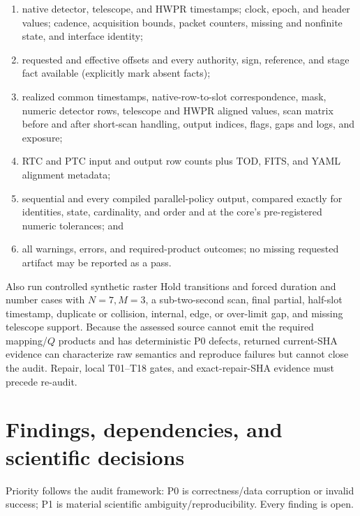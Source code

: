 \documentclass[11pt]{article}
\begin{document}
\begin{enumerate}[leftmargin=2.2em,nosep]
\item native detector, telescope, and HWPR timestamps; clock, epoch, and header values;
cadence, acquisition bounds, packet counters, missing and nonfinite state, and
interface identity;
\item requested and effective offsets and every authority, sign, reference, and stage
fact available (explicitly mark absent facts);
\item realized common timestamps, native-row-to-slot correspondence, mask,
numeric detector rows, telescope and HWPR aligned values, scan matrix before and
after short-scan handling, output indices, flags, gaps and logs, and exposure;
\item RTC and PTC input and output row counts plus TOD, FITS, and YAML alignment metadata;
\item sequential and every compiled parallel-policy output, compared exactly
for identities, state, cardinality, and order and at the core's pre-registered
numeric tolerances; and
\item all warnings, errors, and required-product outcomes; no missing requested
artifact may be reported as a pass.
\end{enumerate}

Also run controlled synthetic raster Hold transitions and forced duration and
number cases with $N=7,M=3$, a sub-two-second scan, final partial, half-slot
timestamp, duplicate or collision, internal, edge, or over-limit gap, and missing
telescope support.  Because the assessed source cannot emit the required
mapping/$Q$ products and has deterministic P0 defects, returned current-SHA
evidence can characterize raw semantics and reproduce failures but cannot
close the audit.  Repair, local T01--T18 gates, and exact-repair-SHA evidence
must precede re-audit.

\section{Findings, dependencies, and scientific decisions}

Priority follows the audit framework: P0 is correctness/data corruption or
invalid success; P1 is material scientific ambiguity/reproducibility.  Every
finding is open.
\end{document}
